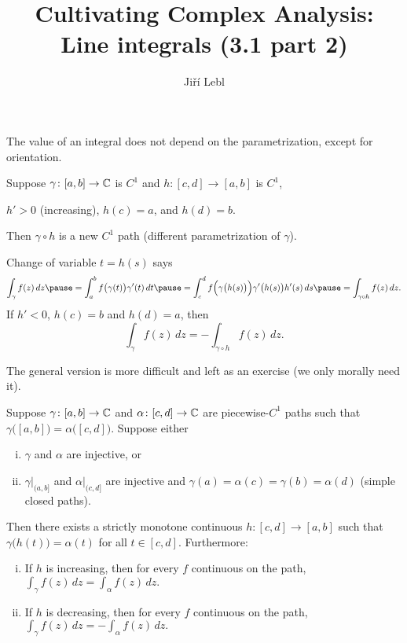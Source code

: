 \documentclass[10pt,aspectratio=169]{beamer}
\author{Ji\v{r}\'i Lebl}
\institute[OSU]{%
Departemento pri Matematiko de Oklahoma {\^S}tata Universitato}
\title{Cultivating Complex Analysis:\\%
Line integrals (3.1 part 2)}
\date{}
\begin{document}
\begin{frame}
\titlepage
\end{frame}

\begin{frame}
The value of an integral does not depend on the parametrization,
\pause
except for orientation.

\medskip
\pause

Suppose $\gamma \colon [a,b] \to {\mathbb{C}}$ is $C^1$ and 
$h \colon [c,d] \to [a,b]$ is $C^1$,

$h' > 0$ (increasing),
$h(c)=a$, and $h(d) = b$.

\medskip
\pause

Then $\gamma \circ h$ is a new $C^1$ path (different parametrization of
$\gamma$).

\medskip
\pause

Change of variable $t=h(s)$ says
\[
\int_{\gamma} f(z) \, dz
\pause
=
\int_a^b f\bigl( \gamma(t) \bigr) \gamma'(t) \, dt
\pause
 =
\int_c^d f\Bigl( \gamma\bigl(h(s)\bigr) \Bigr) \gamma'\bigl(h(s)\bigr) h'(s) \, ds
\pause
=
\int_{\gamma \circ h} f(z) \, dz.
\]
\pause
If $h' < 0$, $h(c)=b$ and $h(d)=a$, \pause then
\[
\int_{\gamma} f(z) \, dz =
- \int_{\gamma \circ h} f(z) \, dz.
\]
\end{frame}

\begin{frame}
The general version is more difficult and left as an exercise
(we only morally need it).

\pause

\begin{proposition}[Reparametrization]
Suppose $\gamma \colon [a,b] \to {\mathbb{C}}$ and $\alpha \colon [c,d] \to {\mathbb{C}}$ are
piecewise-$C^1$ paths such that
$\gamma\bigl([a,b]\bigr) = \alpha\bigl([c,d]\bigr)$.
Suppose either
\begin{enumerate}[(i)]
\item
$\gamma$ and $\alpha$ are injective, or
\item
$\gamma|_{(a,b]}$ and
$\alpha|_{(c,d]}$ are injective and 
$\gamma(a)=\alpha(c)=\gamma(b)=\alpha(d)$ (simple closed paths).
\end{enumerate}
\pause
Then there exists a strictly monotone continuous $h \colon [c,d] \to [a,b]$ such
that $\gamma\bigl(h(t)\bigr) = \alpha(t)$ for all $t \in [c,d]$.
\pause
Furthermore:
\begin{enumerate}[(i)]
\item
If $h$ is increasing, then for every $f$ continuous on the path,
$\displaystyle
\int_\gamma f(z) \, dz = \int_{\alpha} f(z) \, dz .
$
\item
If $h$ is decreasing, then for every $f$ continuous on the path,
$\displaystyle
\int_\gamma f(z) \, dz = - \int_{\alpha} f(z) \, dz .
$
\end{enumerate}
\end{proposition}
\end{frame}
\end{document}
